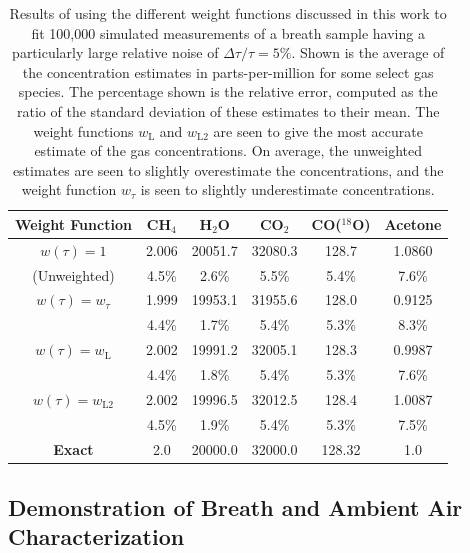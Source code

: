 \documentclass[8pt,a4paper]{report}
\begin{document}
	\begin{table}[H]
		\caption{Results of using the different weight functions discussed in this work to fit 100,000 simulated measurements of a breath sample having a particularly large relative noise of $\Delta \tau/ \tau = 5\%$. Shown is the average of the concentration estimates in parts-per-million for some select gas species. The percentage shown is the relative error, computed as the ratio of the standard deviation of these estimates to their mean. The weight functions $w_\mathrm{L}$ and $w_\mathrm{L2}$ are seen to give the most accurate estimate of the gas concentrations. On average, the unweighted estimates are seen to slightly overestimate the concentrations, and the weight function $w_\tau$ is seen to slightly underestimate concentrations.}
		\begin{center}
			\begin{tabular}{|c|c|c|c|c|c|}
				\hline
				\textbf{Weight Function}    & \textbf{CH$_4$}      & \textbf{H$_2$O }     & \textbf{CO$_2$ } & \textbf{CO($^{18}$O) } & \textbf{Acetone} \\ \hline
				\hline
				$w(\tau) = 1$ &  2.006& 20051.7& 32080.3&  128.7 & 1.0860 \\
				(Unweighted)&    4.5\%&    2.6\%&    5.5\%&    5.4\%&    7.6\% \\ \hline
				$w(\tau) = w_\tau$ &  1.999& 19953.1& 31955.6&  128.0& 0.9125 \\
				&    4.4\%&    1.7\%&    5.4\%&    5.3\%&    8.3\% \\ \hline
				$w(\tau) = w_\mathrm{L}$ &  2.002& 19991.2& 32005.1&  128.3& 0.9987 \\
				&    4.4\%&    1.8\%&    5.4\%&    5.3\% &    7.6\%\\ \hline
				$w(\tau) = w_\mathrm{L2}$ &  2.002& 19996.5& 32012.5&  128.4& 1.0087 \\
				&    4.5\%&    1.9\%&    5.4\%&    5.3\% &    7.5\%\\ \hline \hline
				\textbf{Exact} &          2.0 &      20000.0 &      32000.0 &       128.32 & 1.0  \\ \hline
			\end{tabular}
		\end{center}
		\label{tbl:simulation_weight_results}
	\end{table}
	
	\subsection{Demonstration of Breath and Ambient Air Characterization}
	
\end{document}
